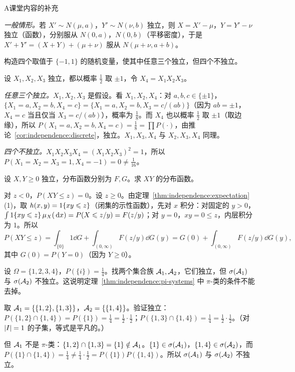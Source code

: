 \begin{exercises}{A}{课堂内容的补充}
\begin{solution}
\emph{一般情形。}若 $X'\sim N(\mu,a)$，$Y'\sim N(\nu,b)$ 独立，则 $X=X'-\mu$，$Y=Y'-\nu$ 独立（函数），分别服从 $N(0,a)$，$N(0,b)$（平移密度），于是 $X'+Y'=(X+Y)+(\mu+\nu)$ 服从 $N(\mu+\nu,a+b)$。
\end{solution}

\item\label{ex:independence:A7} 构造四个取值于 $\{-1,1\}$ 的随机变量，使其中任意三个独立，但四个不独立。
\begin{solution}
设 $X_1,X_2,X_3$ 独立，都以概率 $\frac12$ 取 $\pm1$，令 $X_4=X_1X_2X_3$。

\emph{任意三个独立。}$X_1,X_2,X_3$ 是假设。看 $X_1,X_2,X_4$：对 $a,b,c\in\{\pm1\}$，$\{X_1=a,X_2=b,X_4=c\}=\{X_1=a,X_2=b,X_3=c/(ab)\}$（因为 $ab=\pm1$，$X_4=c$ 当且仅当 $X_3=c/(ab)$），概率为 $\frac18$。而 $X_4$ 也以概率 $\frac12$ 取 $\pm1$（取边缘），所以 $P(X_1=a,X_2=b,X_4=c)=\frac18=\prod P(\cdot)$，由推论~\ref{cor:independence:discrete}，独立。$X_1,X_3,X_4$ 与 $X_2,X_3,X_4$ 同理。

\emph{四个不独立。}$X_1X_2X_3X_4=(X_1X_2X_3)^2=1$，所以 $P(X_1=X_2=X_3=1,X_4=-1)=0\neq\frac1{16}$。
\end{solution}

\item\label{ex:independence:A8} 设 $X,Y\geqslant0$ 独立，分布函数分别为 $F,G$。求 $XY$ 的分布函数。
\begin{solution}
对 $z<0$，$P(XY\leqslant z)=0$。设 $z\geqslant0$。由定理~\ref{thm:independence:expectation}(1)，取 $h(x,y)=1\{xy\leqslant z\}$（闭集的示性函数），先对 $x$ 积分：对固定的 $y>0$，$\int1\{xy\leqslant z\}\,\mu_X(\,\mathrm{d} x)=P(X\leqslant z/y)=F(z/y)$；对 $y=0$，$xy=0\leqslant z$，内层积分为 $1$。所以
\[
P(XY\leqslant z)=\int_{\{0\}}1\dd G+\int_{(0,\infty)}F(z/y)\dd G(y)=G(0)+\int_{(0,\infty)}F(z/y)\dd G(y),
\]
其中 $G(0)=P(Y=0)$（因为 $Y\geqslant0$）。
\end{solution}

\item\label{ex:independence:A9} 设 $\Omega=\{1,2,3,4\}$，$P(\{i\})=\frac14$。找两个集合族 $\mathcal{A}_1,\mathcal{A}_2$，它们独立，但 $\sigma(\mathcal{A}_1)$ 与 $\sigma(\mathcal{A}_2)$ 不独立。这说明定理~\ref{thm:independence:pi-systems} 中 $\pi$-类的条件不能去掉。
\begin{solution}
取 $\mathcal{A}_1=\{\{1,2\},\{1,3\}\}$，$\mathcal{A}_2=\{\{1,4\}\}$。验证独立：$P(\{1,2\}\cap\{1,4\})=P(\{1\})=\frac14=\frac12\cdot\frac12$；$P(\{1,3\}\cap\{1,4\})=\frac14=\frac12\cdot\frac12$。（对 $\lvert I\rvert=1$ 的子集，等式是平凡的。）

但 $\mathcal{A}_1$ 不是 $\pi$-类：$\{1,2\}\cap\{1,3\}=\{1\}\notin\mathcal{A}_1$。$\{1\}\in\sigma(\mathcal{A}_1)$，$\{1,4\}\in\sigma(\mathcal{A}_2)$，而 $P(\{1\}\cap\{1,4\})=\frac14\neq\frac14\cdot\frac12=P(\{1\})P(\{1,4\})$。所以 $\sigma(\mathcal{A}_1)$ 与 $\sigma(\mathcal{A}_2)$ 不独立。
\end{solution}


\end{exercises}
